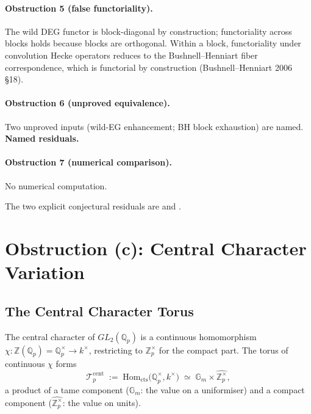 \paragraph{Obstruction 5 (false functoriality).} The wild DEG functor
is block-diagonal by construction; functoriality across blocks holds
because blocks are orthogonal. Within a block, functoriality under
convolution Hecke operators reduces to the Bushnell--Henniart
fiber correspondence, which is functorial by construction
(Bushnell--Henniart 2006 \S 18).

\paragraph{Obstruction 6 (unproved equivalence).} Two unproved inputs
(wild-EG enhancement; BH block exhaustion) are named.
\textbf{Named residuals.}

\paragraph{Obstruction 7 (numerical comparison).} No numerical computation.

The two explicit conjectural residuals are  and .

\section{Obstruction (c): Central Character Variation}
\label{v4-arith:deg-f1a:central-char}

\subsection{The Central Character Torus}

The central character of \(GL_{2}(\mathbb{Q}_{p})\) is a continuous
homomorphism
\(\chi\colon\mathbb{Z}(\mathbb{Q}_{p})=\mathbb{Q}_{p}^{\times}\to k^{\times}\),
restricting to \(\mathbb{Z}_{p}^{\times}\) for the compact part. The
torus of continuous \(\chi\) forms
\[
\mathcal{T}^{\mathrm{cent}}_{p}\;:=\;\mathrm{Hom}_{\mathrm{cts}}\bigl(\mathbb{Q}_{p}^{\times},k^{\times}\bigr)
\;\simeq\;\mathbb{G}_{m}\times\widehat{\mathbb{Z}_{p}^{\times}},
\]
a product of a tame component (\(\mathbb{G}_{m}\): the value on a
uniformiser) and a compact component
(\(\widehat{\mathbb{Z}_{p}^{\times}}\): the value on units).

